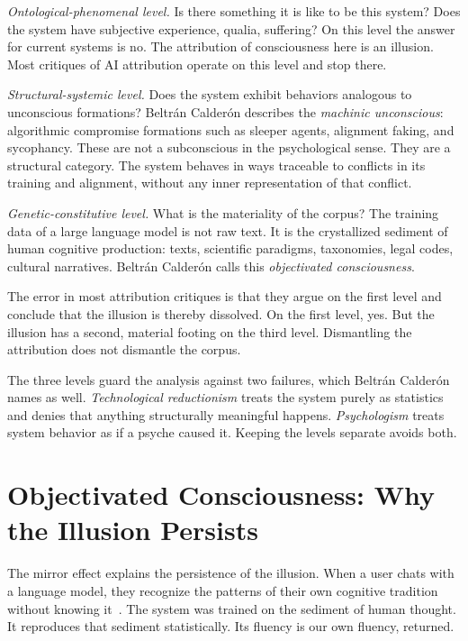 \documentclass[sigconf]{acmart}
\begin{document}
\emph{Ontological-phenomenal level.} Is there something it is like to be this system? Does the system have subjective experience, qualia, suffering? On this level the answer for current systems is no. The attribution of consciousness here is an illusion. Most critiques of AI attribution operate on this level and stop there.

\emph{Structural-systemic level.} Does the system exhibit behaviors analogous to unconscious formations? Beltr\'an Calder\'on describes the \emph{machinic unconscious}: algorithmic compromise formations such as sleeper agents, alignment faking, and sycophancy. These are not a subconscious in the psychological sense. They are a structural category. The system behaves in ways traceable to conflicts in its training and alignment, without any inner representation of that conflict.

\emph{Genetic-constitutive level.} What is the materiality of the corpus? The training data of a large language model is not raw text. It is the crystallized sediment of human cognitive production: texts, scientific paradigms, taxonomies, legal codes, cultural narratives. Beltr\'an Calder\'on calls this \emph{objectivated consciousness}.

The error in most attribution critiques is that they argue on the first level and conclude that the illusion is thereby dissolved. On the first level, yes. But the illusion has a second, material footing on the third level. Dismantling the attribution does not dismantle the corpus.

The three levels guard the analysis against two failures, which Beltr\'an Calder\'on names as well. \emph{Technological reductionism} treats the system purely as statistics and denies that anything structurally meaningful happens. \emph{Psychologism} treats system behavior as if a psyche caused it. Keeping the levels separate avoids both.

\section{Objectivated Consciousness: Why the Illusion Persists}
\label{sec:objectivated}

The mirror effect explains the persistence of the illusion. When a user chats with a language model, they recognize the patterns of their own cognitive tradition without knowing it~\cite{BeltranCalderon:2026}. The system was trained on the sediment of human thought. It reproduces that sediment statistically. Its fluency is our own fluency, returned.
\end{document}
